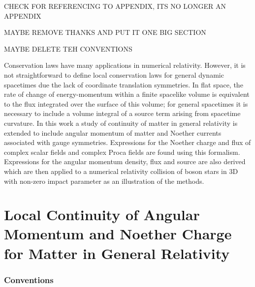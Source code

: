 
CHECK FOR REFERENCING TO APPENDIX, ITS NO LONGER AN APPENDIX

MAYBE REMOVE THANKS AND PUT IT ONE BIG SECTION

MAYBE DELETE TEH CONVENTIONS

Conservation laws have many applications in numerical relativity. However, it is not straightforward to define local conservation laws for general dynamic spacetimes due the lack of coordinate translation symmetries. In flat space, the rate of change of energy-momentum within a finite spacelike volume is equivalent to the flux integrated over the surface of this volume; for general spacetimes it is necessary to include a volume integral of a source term arising from spacetime curvature. In this work a study of continuity of matter in general relativity is extended to include angular momentum of matter and Noether currents associated with gauge symmetries. Expressions for the Noether charge and flux of complex scalar fields and complex Proca fields are found using this formalism. Expressions for the angular momentum density, flux and source are also derived which are then applied to a numerical relativity collision of boson stars in 3D with non-zero impact parameter as an illustration of the methods.








\section{Local Continuity of Angular Momentum and Noether Charge for Matter in General Relativity}
\subsubsection*{Conventions}

